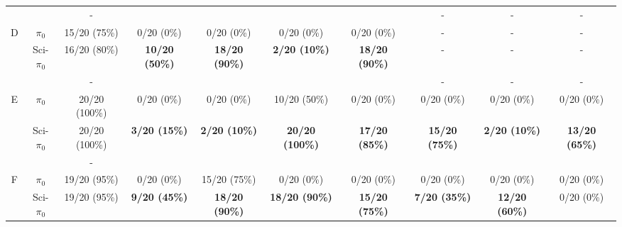 \documentclass[letterpaper]{article} %
\begin{document}
\begin{table}[!ht]
\begin{tabular}{cccccccccc}
    &&\cellcolor{gray!25}-&\cellcolor{gray!25}{\color{violet}$50\%\uparrow$}&\cellcolor{gray!25}{\color{violet}$40\%\uparrow$}&\cellcolor{gray!25}{\color{violet}$70\%\uparrow$}&\cellcolor{gray!25}{\color{violet}$90\%\uparrow$}&\cellcolor{gray!25}-&\cellcolor{gray!25}-&\cellcolor{gray!25}-\\

    \cline{1-10}
    \multirow{3}{*}{D}&$\pi_0$& 15/20 (75\%) & 0/20 (0\%) &0/20 (0\%)&0/20 (0\%)&0/20 (0\%)&-&-&-\\
    &\multirow{2}{*}{Sci-$\pi_0$} & \cellcolor{gray!25}16/20 (80\%) & \cellcolor{gray!25}\textbf{10/20 (50\%)} &\cellcolor{gray!25}\textbf{18/20 (90\%)}&\cellcolor{gray!25}\textbf{2/20 (10\%)}&\cellcolor{gray!25}\textbf{18/20 (90\%)}&\cellcolor{gray!25}-&\cellcolor{gray!25}-&\cellcolor{gray!25}-\\

    &&\cellcolor{gray!25}-&\cellcolor{gray!25}{\color{violet}$50\%\uparrow$}&\cellcolor{gray!25}{\color{violet}$90\%\uparrow$}&\cellcolor{gray!25}{\color{violet}$10\%\uparrow$}&\cellcolor{gray!25}{\color{violet}$90\%\uparrow$}&\cellcolor{gray!25}-&\cellcolor{gray!25}-&\cellcolor{gray!25}-\\

    \cline{1-10}
    \multirow{3}{*}{E}&$\pi_0$&  20/20 (100\%) & 0/20 (0\%)&0/20 (0\%)&10/20 (50\%)&0/20 (0\%)&0/20 (0\%)&0/20 (0\%)&0/20 (0\%)\\
    &\multirow{2}{*}{Sci-$\pi_0$} &  \cellcolor{gray!25}20/20 (100\%) & \cellcolor{gray!25}\textbf{3/20 (15\%)} & \cellcolor{gray!25}\textbf{2/20 (10\%)} & \cellcolor{gray!25}\textbf{20/20 (100\%)} & \cellcolor{gray!25}\textbf{17/20 (85\%)} &\cellcolor{gray!25}\textbf{15/20 (75\%)}&\cellcolor{gray!25}\textbf{2/20 (10\%)}&\cellcolor{gray!25}\textbf{13/20 (65\%)}\\

    &&\cellcolor{gray!25}-&\cellcolor{gray!25}{\color{violet}$15\%\uparrow$}&\cellcolor{gray!25}{\color{violet}$10\%\uparrow$}&\cellcolor{gray!25}{\color{violet}$50\%\uparrow$}&\cellcolor{gray!25}{\color{violet}$85\%\uparrow$}&\cellcolor{gray!25}{\color{violet}$75\%\uparrow$}&\cellcolor{gray!25}{\color{violet}$10\%\uparrow$}&\cellcolor{gray!25}{\color{violet}$65\%\uparrow$}\\

    \cline{1-10}
    \multirow{3}{*}{F}&$\pi_0$& 19/20 (95\%) & 0/20 (0\%)&15/20 (75\%)&0/20 (0\%)&0/20 (0\%)&0/20 (0\%)&0/20 (0\%)&0/20 (0\%)\\
    &\multirow{2}{*}{Sci-$\pi_0$} & \cellcolor{gray!25}19/20 (95\%) & \cellcolor{gray!25}\textbf{9/20 (45\%)} &\cellcolor{gray!25}\textbf{18/20 (90\%)}&\cellcolor{gray!25}\textbf{18/20 (90\%)}&\cellcolor{gray!25}\textbf{15/20 (75\%)}&\cellcolor{gray!25}\textbf{7/20 (35\%)}&\cellcolor{gray!25}\textbf{12/20 (60\%)}&\cellcolor{gray!25}0/20 (0\%)\\


\end{tabular}
\end{table}
\end{document}

